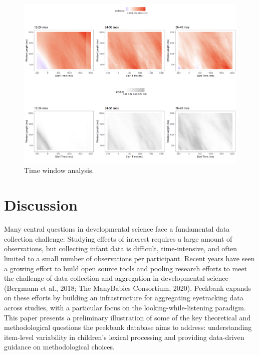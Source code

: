 \documentclass[10pt, letterpaper]{article}
\newenvironment{CodeChunk}{}{}
\begin{document}
\begin{CodeChunk}
\begin{figure}[h]

{\centering \includegraphics{figs/time_window-1} 

}

\caption[Time window analysis]{Time window analysis.}\label{fig:time_window}
\end{figure}
\end{CodeChunk}

\hypertarget{discussion}{%
\section{Discussion}\label{discussion}}

Many central questions in developmental science face a fundamental data
collection challenge: Studying effects of interest requires a large
amount of observations, but collecting infant data is difficult,
time-intensive, and often limited to a small number of observations per
participant. Recent years have seen a growing effort to build open
source tools and pooling research efforts to meet the challenge of data
collection and aggregation in developmental science (Bergmann et al.,
2018; The ManyBabies Consortium, 2020). Peekbank expands on these
efforts by building an infrastructure for aggregating eyetracking data
across studies, with a particular focus on the looking-while-listening
paradigm. This paper presents a preliminary illustration of some of the
key theoretical and methodological questions the peekbank database aims
to address: understanding item-level variability in children's lexical
processing and providing data-driven guidance on methodological choices.
\end{document}
